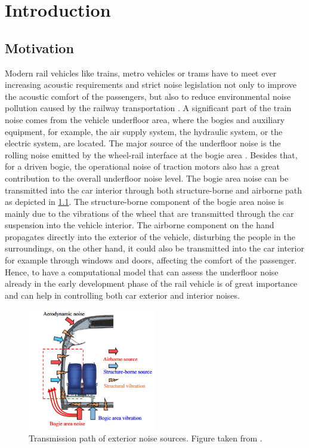 \chapter{Introduction}
\label{chap:Introduction}

\section{Motivation}

Modern rail vehicles like trains, metro vehicles or trams have to meet ever increasing acoustic requirements and strict noise legislation not only to improve the acoustic comfort of the passengers, but also to reduce environmental noise pollution caused by the railway transportation \cite{paozalyte_pollution_2011, li_25d_2021, zhang_sound_2019}.
A significant part of the train noise comes from the vehicle underfloor area, where the bogies and auxiliary equipment, for example, the air supply system, the hydraulic system, or the electric system, are located. The major source of the underfloor noise is the rolling noise emitted by the wheel-rail interface at the bogie area \cite{LUNDEN20093}. Besides that, for a driven bogie, the operational noise of traction motors also has a great contribution to the overall underfloor noise level\cite{Noh_2017, zhang_sound_2019}.
The bogie area noise can be transmitted into the car interior through both structure-borne and airborne path as depicted in \cref{fig:transmission_path}. The structure-borne component of the bogie area noise is mainly due to the vibrations of the wheel that are transmitted through the car suspension into the vehicle interior. The airborne component on the hand propagates directly into the exterior of the vehicle, disturbing the people in the surroundings, on the other hand, it could also be transmitted into the car interior for example through windows and doors, affecting the comfort of the passenger.
%
Hence, to have a computational model that can assess the underfloor noise already in the early development phase of the rail vehicle is of great importance and can help in controlling both car exterior and interior noises.

\begin{figure}
	\centering
	\includegraphics[width=0.5\textwidth]{fig/noise_transmission_path.png}
	\caption{Transmission path of exterior noise sources. Figure taken from \cite{zhang_sound_2019}.}
	\label{fig:transmission_path}
\end{figure}


